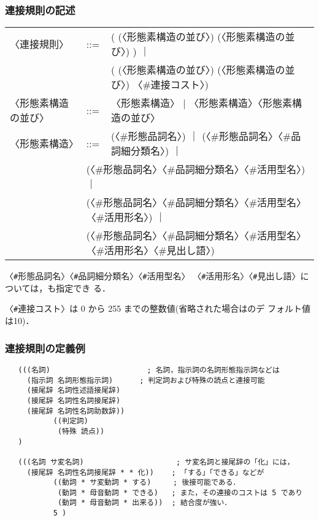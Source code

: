 \documentclass[a4j,titlepage]{jarticle}
\begin{document}
\subsubsection{連接規則の記述}

\noindent
\begin{tt}
\begin{tabular}{lll}
〈連接規則〉& ::= & ( (〈形態素構造の並び〉) (〈形態素構造の並び〉) ) ｜\\
 & & ( (〈形態素構造の並び〉) (〈形態素構造の並び〉) 〈\#連接コスト〉) \\

〈形態素構造の並び〉& ::= & 〈形態素構造〉
                          | 〈形態素構造〉〈形態素構造の並び〉\\
〈形態素構造〉& ::= & (〈\#形態品詞名〉) ｜
        (〈\#形態品詞名〉〈\#品詞細分類名〉) ｜\\
 & \multicolumn{2}{l}{(〈\#形態品詞名〉〈\#品詞細分類名〉〈\#活用型名〉) ｜}\\
 & \multicolumn{2}{l}{(〈\#形態品詞名〉〈\#品詞細分類名〉〈\#活用型名〉〈\#活用形名〉) ｜}\\
 & \multicolumn{2}{l}{(〈\#形態品詞名〉〈\#品詞細分類名〉〈\#活用型名〉〈\#活用形名〉〈\#見出し語〉)}
\end{tabular}
\end{tt}

\vspace{2mm}
\noindent
〈{\tt \#}形態品詞名〉〈{\tt \#}品詞細分類名〉〈{\tt \#}活用型名〉
〈{\tt \#}活用形名〉〈{\tt \#}見出し語〉については，{\tt *}も指定でき
る．

\noindent
〈{\tt \#}連接コスト〉は 0 から 255 までの整数値(省略された場合はのデ
フォルト値は10)．

\subsubsection{連接規則の定義例}

\begin{verbatim}
   (((名詞)                      ; 名詞，指示詞の名詞形態指示詞などは
     (指示詞 名詞形態指示詞)      ; 判定詞および特殊の読点と連接可能
     (接尾辞 名詞性述語接尾辞)
     (接尾辞 名詞性名詞接尾辞)
     (接尾辞 名詞性名詞助数辞))
           ((判定詞)
            (特殊 読点))
   )

   (((名詞 サ変名詞)                     ; サ変名詞と接尾辞の「化」には，
     (接尾辞 名詞性名詞接尾辞 * * 化))    ; 「する」「できる」などが
           ((動詞 * サ変動詞 * する)     ; 後接可能である．
            (動詞 * 母音動詞 * できる)   ; また，その連接のコストは 5 であり
            (動詞 * 母音動詞 * 出来る))  ; 結合度が強い．
           5 )
\end{verbatim}
\end{document}
